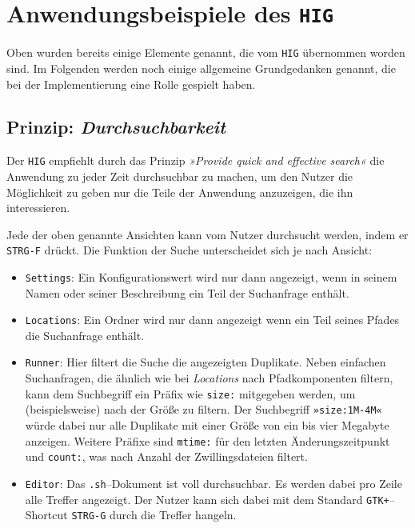 \documentclass[11pt,ngerman,toc=listof,index=totoc]{scrreprt}
\providecommand{\tightlist}{%
  \setlength{\itemsep}{0pt}\setlength{\parskip}{0pt}}
\begin{document}
\section{\texorpdfstring{Anwendungsbeispiele des
\texttt{HIG}}{Anwendungsbeispiele des HIG}}\label{anwendungsbeispiele-des-hig}

Oben wurden bereits einige Elemente genannt, die vom \texttt{HIG}
übernommen worden sind. Im Folgenden werden noch einige allgemeine
Grundgedanken genannt, die bei der Implementierung eine Rolle gespielt
haben.

\subsection{\texorpdfstring{Prinzip:
\emph{Durchsuchbarkeit}}{Prinzip: Durchsuchbarkeit}}\label{prinzip-durchsuchbarkeit}

Der \texttt{HIG} empfiehlt durch das Prinzip \emph{»Provide quick and
effective search«} die Anwendung zu jeder Zeit durchsuchbar zu machen,
um den Nutzer die Möglichkeit zu geben nur die Teile der Anwendung
anzuzeigen, die ihn interessieren.

Jede der oben genannte Ansichten kann vom Nutzer durchsucht werden,
indem er \texttt{STRG-F} drückt. Die Funktion der Suche unterscheidet
sich je nach Ansicht:

\begin{itemize}
\tightlist
\item
  \texttt{Settings}: Ein Konfigurationswert wird nur dann angezeigt,
  wenn in seinem Namen oder seiner Beschreibung ein Teil der Suchanfrage
  enthält.
\item
  \texttt{Locations}: Ein Ordner wird nur dann angezeigt wenn ein Teil
  seines Pfades die Suchanfrage enthält.
\item
  \texttt{Runner}: Hier filtert die Suche die angezeigten Duplikate.
  Neben einfachen Suchanfragen, die ähnlich wie bei \emph{Locations}
  nach Pfadkomponenten filtern, kann dem Suchbegriff ein Präfix wie
  \texttt{size:} mitgegeben werden, um (beispielsweise) nach der Größe
  zu filtern. Der Suchbegriff \texttt{»size:1M-4M«} würde dabei nur alle
  Duplikate mit einer Größe von ein bis vier Megabyte anzeigen. Weitere
  Präfixe sind \texttt{mtime:} für den letzten Änderungszeitpunkt und
  \texttt{count:}, was nach Anzahl der Zwillingsdateien filtert.
\item
  \texttt{Editor}: Das \texttt{.sh}--Dokument ist voll durchsuchbar. Es
  werden dabei pro Zeile alle Treffer angezeigt. Der Nutzer kann sich
  dabei mit dem Standard \texttt{GTK+}--Shortcut \texttt{STRG-G} durch
  die Treffer hangeln.
\end{itemize}
\end{document}
